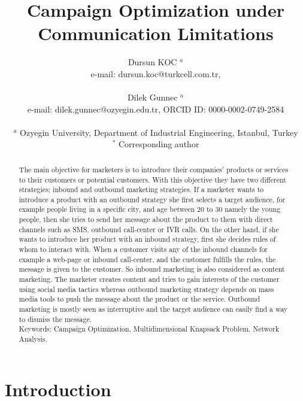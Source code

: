 \documentclass[11pt]{article}
\title{Campaign Optimization under Communication Limitations \\}
\author{Dursun KOC $^{a}$ \\ 
	e-mail: dursun.koc@turkcell.com.tr, \\\\
	Dilek Gunnec $^{a}$ \\ 
	e-mail: dilek.gunnec@ozyegin.edu.tr, ORCID ID: 0000-0002-0749-2584 \\\\
$^{a}$ Ozyegin University, Department of Industrial Engineering, Istanbul, Turkey \\ 
$^{\ast}$ Corresponding author \\ }
\date{}
\begin{document}
\maketitle
\begin{abstract}
The main objective for marketers is to introduce their companies’ products or services to their customers or potential customers. With this objective they have two different strategies; inbound and outbound marketing strategies. If a marketer wants to introduce a product with an outbound strategy she first selects a target audience, for example people living in a specific city, and age between 20 to 30 namely the young people, then she tries to send her message about the product to them with direct channels such as SMS, outbound call-center or IVR calls. On the other hand, if she wants to introduce her product with an inbound strategy, first she decides rules of whom to interact with. When a customer visits any of the inbound channels for example a web-page or inbound call-center, and the customer fulfills the rules, the message is given to the customer. So inbound marketing is also considered as content marketing. The marketer creates content and tries to gain interests of the customer using social media tactics whereas outbound marketing strategy depends on mass media tools to push the message about the product or the service. Outbound marketing is mostly seen as interruptive and the target audience can easily find a way to dismiss the message. \\

Keywords: Campaign Optimization, Multidimensional Knapsack Problem, Network Analysis.

\end{abstract}


\newpage

\section{Introduction}
\end{document}
